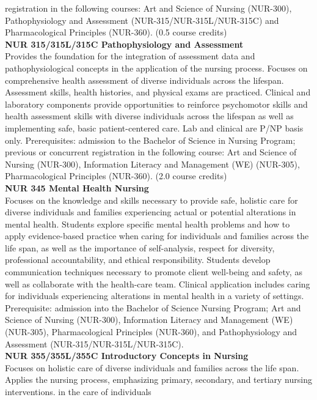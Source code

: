 \documentclass[
  letterpaper,
]{scrbook}
\begin{document}
registration in the following courses: Art and Science of Nursing
(NUR-300), Pathophysiology and Assessment (NUR-315/NUR-315L/NUR-315C)
and Pharmacological Principles (NUR-360). (0.5 course credits)\\
\textbf{NUR 315/315L/315C Pathophysiology and Assessment}\\
Provides the foundation for the integration of assessment data and
pathophysiological concepts in the application of the nursing process.
Focuses on comprehensive health assessment of diverse individuals across
the lifespan. Assessment skills, health histories, and physical exams
are practiced. Clinical and laboratory components provide opportunities
to reinforce psychomotor skills and health assessment skills with
diverse individuals across the lifespan as well as implementing safe,
basic patient-centered care. Lab and clinical are P/NP basis only.
Prerequisites: admission to the Bachelor of Science in Nursing Program;
previous or concurrent registration in the following course: Art and
Science of Nursing (NUR-300), Information Literacy and Management (WE)
(NUR-305), Pharmacological Principles (NUR-360). (2.0 course credits)\\
\textbf{NUR 345 Mental Health Nursing}\\
Focuses on the knowledge and skills necessary to provide safe, holistic
care for diverse individuals and families experiencing actual or
potential alterations in mental health. Students explore specific mental
health problems and how to apply evidence-based practice when caring for
individuals and families across the life span, as well as the importance
of self-analysis, respect for diversity, professional accountability,
and ethical responsibility. Students develop communication techniques
necessary to promote client well-being and safety, as well as
collaborate with the health-care team. Clinical application includes
caring for individuals experiencing alterations in mental health in a
variety of settings. Prerequisite: admission into the Bachelor of
Science Nursing Program; Art and Science of Nursing (NUR-300),
Information Literacy and Management (WE) (NUR-305), Pharmacological
Principles (NUR-360), and Pathophysiology and Assessment
(NUR-315/NUR-315L/NUR-315C).\\
\textbf{NUR 355/355L/355C Introductory Concepts in Nursing}\\
Focuses on holistic care of diverse individuals and families across the
life span. Applies the nursing process, emphasizing primary, secondary,
and tertiary nursing interventions. in the care of individuals
\end{document}
